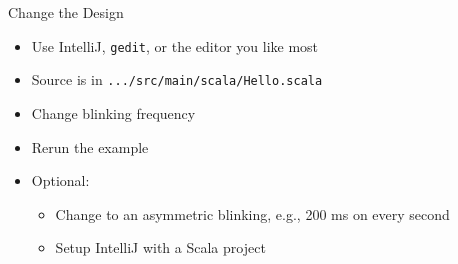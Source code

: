 \documentclass[xcolor=pdflatex,dvipsnames,table]{beamer}
\newcommand{\code}[1]{{\texttt{#1}}}
\begin{document}
\begin{frame}[fragile]{Change the Design}
\begin{itemize}
\item Use IntelliJ, \code{gedit}, or the editor you like most
\item Source is in \code{.../src/main/scala/Hello.scala}
\item Change blinking frequency
\item Rerun the example
\item Optional:
\begin{itemize}
\item Change to an asymmetric blinking, e.g., 200 ms on every second 
\item Setup IntelliJ with a Scala project 
\end{itemize}
\end{itemize}
\end{frame}
\end{document}
